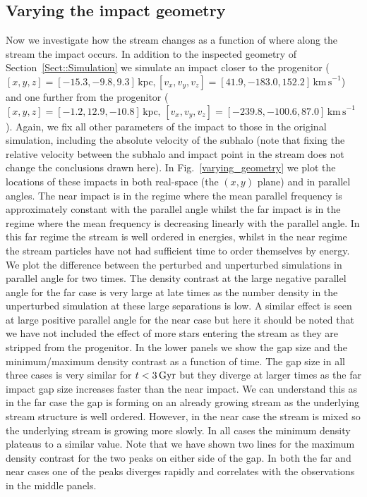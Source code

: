 \documentclass[useAMS,usenatbib,fleqn,a4paper]{mn2e}
\def\Gyr{\,{\rm Gyr}}
\begin{document}
\subsection{Varying the impact geometry}
Now we investigate how the stream changes as a function of where along the stream the impact occurs. In addition to the inspected geometry of Section~\ref{Sect::Simulation} we simulate an impact closer to the progenitor ($[x,y,z]=[-15.3,-9.8,9.3]\,\mathrm{kpc},[v_x,v_y,v_z]=[41.9,-183.0,152.2]\,\mathrm{km\,s}^{-1}$) and one further from the progenitor ($[x,y,z]=[-1.2,12.9,-10.8]\,\mathrm{kpc},\,[v_x,v_y,v_z]=[-239.8,-100.6,87.0]\,\mathrm{km\,s}^{-1}$). Again, we fix all other parameters of the impact to those in the original simulation, including the absolute velocity of the subhalo (note that fixing the relative velocity between the subhalo and impact point in the stream does not change the conclusions drawn here). In Fig.~\ref{varying_geometry} we plot the locations of these impacts in both real-space (the $(x,y)$ plane) and in parallel angles. The near impact is in the regime where the mean parallel frequency is approximately constant with the parallel angle whilst the far impact is in the regime where the mean frequency is decreasing linearly with the parallel angle. In this far regime the stream is well ordered in energies, whilst in the near regime the stream particles have not had sufficient time to order themselves by energy. We plot the difference between the perturbed and unperturbed simulations in parallel angle for two times. The density contrast at the large negative parallel angle for the far case is very large at late times as the number density in the unperturbed simulation at these large separations is low. A similar effect is seen at large positive parallel angle for the near case but here it should be noted that we have not included the effect of more stars entering the stream as they are stripped from the progenitor. In the lower panels we show the gap size and the minimum/maximum density contrast as a function of time. The gap size in all three cases is very similar for $t<3\Gyr$ but they diverge at larger times as the far impact gap size increases faster than the near impact. We can understand this as in the far case the gap is forming on an already growing stream as the underlying stream structure is well ordered. However, in the near case the stream is mixed so the underlying stream is growing more slowly. In all cases the minimum density plateaus to a similar value. Note that we have shown two lines for the maximum density contrast for the two peaks on either side of the gap. In both the far and near cases one of the peaks diverges rapidly and correlates with the observations in the middle panels.
\end{document}
